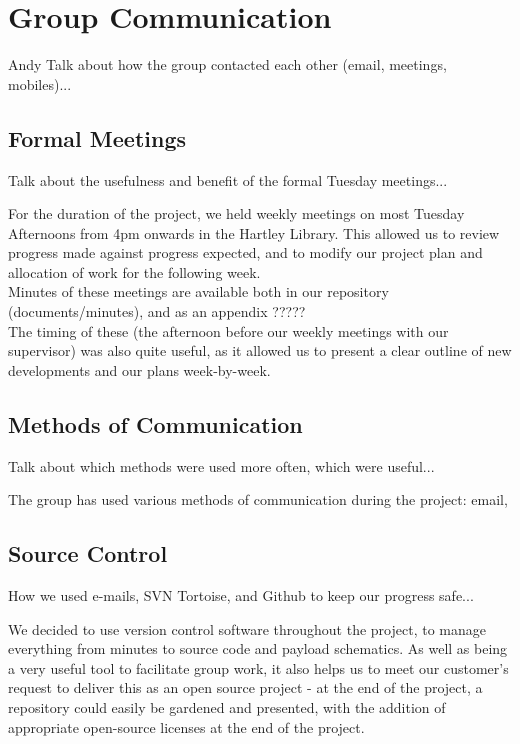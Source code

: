 \section{Group Communication}
Andy
Talk about how the group contacted each other (email, meetings, mobiles)...



\subsection{Formal Meetings}
Talk about the usefulness and benefit of the formal Tuesday meetings...

For the duration of the project, we held weekly meetings on most Tuesday 
Afternoons from 4pm onwards in the Hartley Library. This allowed us to 
review progress made against progress expected, and to modify our project 
plan and allocation of work for the following week.
\\
Minutes of these meetings are available both in our repository \cite{github} 
(documents/minutes), and as an appendix ?????
\\
The timing of these (the afternoon before our weekly meetings with our 
supervisor) was also quite useful, as it allowed us to present a clear outline 
of new developments and our plans week-by-week.

\subsection{Methods of Communication}
Talk about which methods were used more often, which were useful...

The group has used various methods of communication during the project: 
email, 

\subsection{Source Control}
How we used e-mails, SVN Tortoise, and Github to keep our progress safe...

We decided to use version control software throughout the project, to manage 
everything from minutes to source code and payload schematics. As well as 
being a very useful tool to facilitate group work, it also helps us to meet 
our customer's request to deliver this as an open source project - at the end 
of the project, a repository could easily be gardened and presented, with the 
addition of appropriate open-source licenses at the end of the project.

